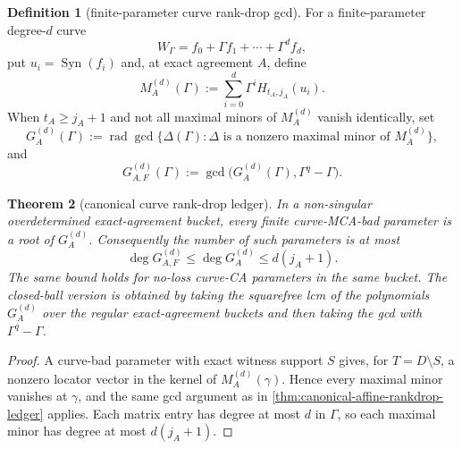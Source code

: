 \documentclass[11pt]{article}
\newtheorem{theorem}{Theorem}[section]
\theoremstyle{definition}
\newtheorem{definition}[theorem]{Definition}
\theoremstyle{remark}
\newcommand{\Syn}{\operatorname{Syn}}
\begin{document}
\begin{definition}[finite-parameter curve rank-drop gcd]
\label{def:curve-rankdrop-gcd}
For a finite-parameter degree-$d$ curve
\[
        W_\Gamma=f_0+\Gamma f_1+\cdots+\Gamma^d f_d,
\]
put $u_i=\Syn(f_i)$ and, at exact agreement $A$, define
\[
        M_A^{(d)}(\Gamma):=
        \sum_{i=0}^{d}\Gamma^i H_{t_A,j_A}(u_i).
\]
When $t_A\ge j_A+1$ and not all maximal minors of $M_A^{(d)}$ vanish
identically, set
\[
        G_A^{(d)}(\Gamma)
        :=\operatorname{rad}\gcd\{\Delta(\Gamma):
              \Delta\text{ is a nonzero maximal minor of }M_A^{(d)}\},
\]
and
\[
        G_{A,F}^{(d)}(\Gamma):=
        \gcd\bigl(G_A^{(d)}(\Gamma),\Gamma^q-\Gamma\bigr).
\]
\end{definition}

\begin{theorem}[canonical curve rank-drop ledger]
\label{thm:canonical-curve-rankdrop-ledger}
In a non-singular overdetermined exact-agreement bucket, every finite
curve-MCA-bad parameter is a root of $G_A^{(d)}$.  Consequently the number of
such parameters is at most
\[
        \deg G_{A,F}^{(d)}
        \le \deg G_A^{(d)}
        \le d(j_A+1).
\]
The same bound holds for no-loss curve-CA parameters in the same bucket.  The
closed-ball version is obtained by taking the squarefree lcm of the polynomials
$G_A^{(d)}$ over the regular exact-agreement buckets and then taking the gcd with
$\Gamma^q-\Gamma$.
\end{theorem}

\begin{proof}
A curve-bad parameter with exact witness support $S$ gives, for
$T=D\setminus S$, a nonzero locator vector in the kernel of
$M_A^{(d)}(\gamma)$.  Hence every maximal minor vanishes at $\gamma$, and the
same gcd argument as in \cref{thm:canonical-affine-rankdrop-ledger} applies.
Each matrix entry has degree at most $d$ in $\Gamma$, so each maximal minor has
degree at most $d(j_A+1)$.
\end{proof}
\end{document}
